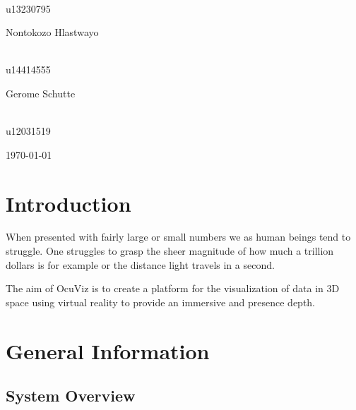 \documentclass[a4paper,12pt]{article}
\begin{document}
\begin{titlepage}
\begin{center}
\begin{minipage}{0.4\textwidth}
\begin{flushright}
\emph{} \\
u13230795  
\end{flushright}
\end{minipage}
\begin{minipage}{0.4\textwidth}
\begin{flushleft} \large
Nontokozo Hlastwayo
\end{flushleft}
\end{minipage}
\begin{minipage}{0.4\textwidth}
\begin{flushright} \large
\emph{} \\
u14414555
\end{flushright}
\end{minipage}
\begin{minipage}{0.4\textwidth}
\begin{flushleft} \large
Gerome Schutte
\end{flushleft}
\end{minipage}
\begin{minipage}{0.4\textwidth}
\begin{flushright} \large
\emph{} \\
u12031519
\end{flushright}
\end{minipage}
\vfill

{\large \today}
\end{center}
\end{titlepage}
\footnotesize
\normalsize

%
%
%
%
%
%
%

\tableofcontents
\newpage
\setlength{\parindent}{0em}
\section{Introduction}
When presented with fairly large or small numbers we as human beings tend to struggle. One struggles to grasp the sheer magnitude of how much a trillion dollars is for example or the distance light travels in a second.

The aim of OcuViz is to create a platform for the visualization of data in 3D space using virtual reality to provide an immersive and presence depth.

\section{General Information}
\subsection{System Overview}
\end{document}
